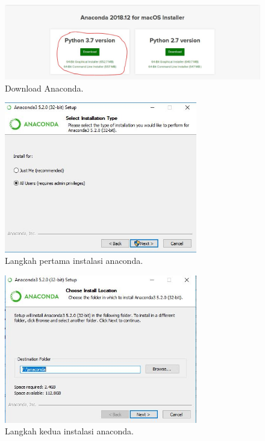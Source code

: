 \begin{figure}[ht]\centerline{\includegraphics[width=1\textwidth]{figures/1.JPG}}\caption{Download Anaconda.}\end{figure}
\begin{figure}[ht]\centerline{\includegraphics[width=0.75\textwidth]{figures/2.JPG}}\caption{Langkah pertama instalasi anaconda.}\end{figure}
\begin{figure}[ht]\centerline{\includegraphics[width=0.75\textwidth]{figures/3.JPG}}\caption{Langkah kedua instalasi anaconda.}\end{figure}

